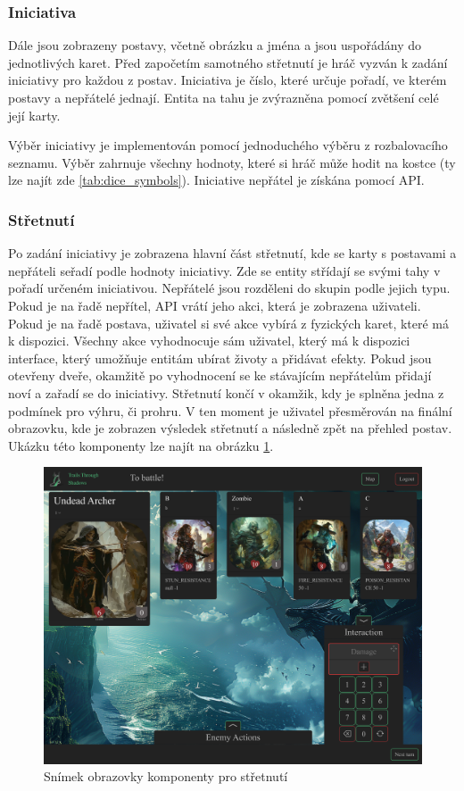 \subsubsection*{Iniciativa}
Dále jsou zobrazeny postavy, včetně obrázku a jména a jsou uspořádány do jednotlivých karet. Před započetím samotného střetnutí je hráč vyzván k zadání iniciativy pro každou z postav. Iniciativa je číslo, které určuje pořadí, ve kterém postavy a nepřátelé jednají. Entita na tahu je zvýrazněna pomocí zvětšení celé její karty.

Výběr iniciativy je implementován pomocí jednoduchého výběru z rozbalovacího seznamu. Výběr zahrnuje všechny hodnoty, které si hráč může hodit na kostce (ty lze najít zde \ref{tab:dice_symbols}). Iniciative nepřátel je získána pomocí API.

\subsubsection*{Střetnutí}
Po zadání iniciativy je zobrazena hlavní část střetnutí, kde se karty s postavami a nepřáteli seřadí podle hodnoty iniciativy. Zde se entity střídají se svými tahy v pořadí určeném iniciativou. Nepřátelé jsou rozděleni do skupin podle jejich typu. Pokud je na řadě nepřítel, API vrátí jeho akci, která je zobrazena uživateli. Pokud je na řadě postava, uživatel si své akce vybírá z fyzických karet, které má k dispozici. Všechny akce vyhodnocuje sám uživatel, který má k dispozici interface, který umožňuje entitám ubírat životy a přidávat efekty. Pokud jsou otevřeny dveře, okamžitě po vyhodnocení se ke stávajícím nepřátelům přidají noví a zařadí se do iniciativy. Střetnutí končí v okamžik, kdy je splněna jedna z podmínek pro výhru, či prohru. V ten moment je uživatel přesměrován na finální obrazovku, kde je zobrazen výsledek střetnutí a následně zpět na přehled postav. Ukázku této komponenty lze najít na obrázku \ref{fig:combat}.

\begin{figure}[H]
  \centering
  \includegraphics[width=.95\textwidth]{resources/figures/TTS-Encounter.png}
  \caption{Snímek obrazovky komponenty pro střetnutí}
  \label{fig:combat}
\end{figure}


